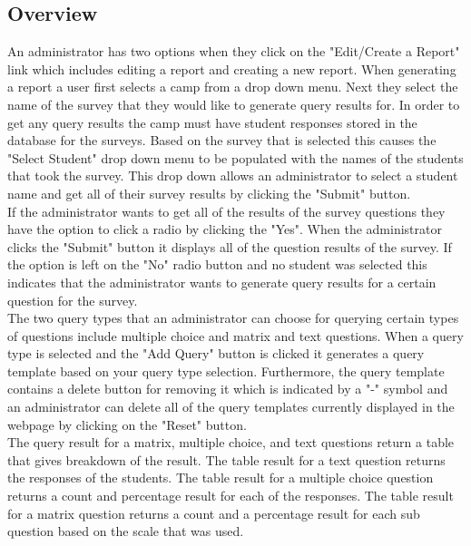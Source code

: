 \documentclass[../final.tex]{subfiles}
\begin{document}

	\subsection{Overview}
	An administrator has two options when they click on the "Edit/Create a Report" link which includes editing a report and creating a new report. When generating a report a user first selects a camp from a drop down menu. Next they select the name of the survey that they would like to generate query results for. In order to get any query results the camp must have student responses stored in the database for the surveys. Based on the survey that is selected this causes the "Select Student" drop down menu to be populated with the names of the students that took the survey. This drop down allows an administrator to select a student name and get all of their survey results by clicking the "Submit" button.\\ 
	If the administrator wants to get all of the results of the survey questions they have the option to click a radio by clicking the "Yes". When the administrator clicks the "Submit" button it displays all of the question results of the survey. If the option is left on the "No" radio button and no student was selected this indicates that the administrator wants to generate query results for a certain question for the survey.\\ The two query types that an administrator can choose for querying certain types of questions include multiple choice and matrix and text questions. When a query type is selected and the "Add Query" button is clicked it generates a query template based on your query type selection. Furthermore, the query template contains a delete button for removing it which is indicated by a "-" symbol and an administrator can delete all of the query templates currently displayed in the webpage by clicking on the "Reset" button.\\
	 The query result for a matrix, multiple choice, and text questions return a table that gives breakdown of the result. The table result for a text question returns the responses of the students. The table result for a multiple choice question returns a count and percentage result for each of the responses. The table result for a matrix question returns a count and a percentage result for each sub question based on the scale that was used.\\
\end{document}
